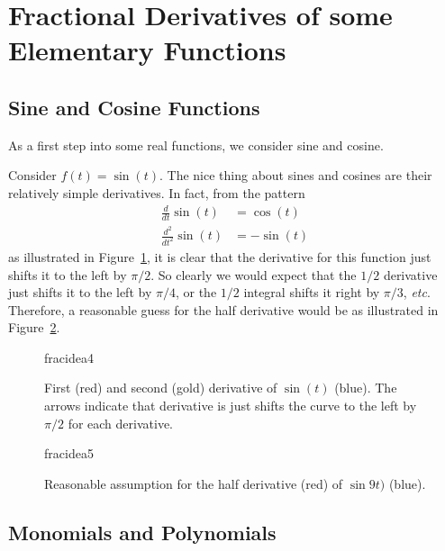 \section{Fractional Derivatives of some Elementary Functions}
\subsection{Sine and Cosine Functions}
As a first step into some real functions, we consider sine and cosine.

\begin{example}
  Consider $f(t) = \sin(t)$. The nice thing about sines and cosines are their relatively simple derivatives. In fact, from the pattern
  \begin{align*}
    \frac{d}{dt} \sin(t) &= \cos(t) \\
    \frac{d^2}{dt^2} \sin(t) &= -\sin(t)
  \end{align*}
  as illustrated in Figure~\ref{fig:fracidea4}, it is clear that the derivative for this function just shifts it to the left by $\pi/2$. So clearly we would expect that the $1/2$ derivative just shifts it to the left by $\pi/4$, or the $1/2$ integral shifts it right by $\pi/3$, \textit{etc}. Therefore, a reasonable guess for the half derivative would be as illustrated in Figure~\ref{fig:fracidea5}.

  \begin{figure}
    \centering
    {fracidea4}
    \caption{First (red) and second (gold) derivative of $\sin(t)$ (blue). The arrows indicate that derivative is just shifts the curve to the left by $\pi/2$ for each derivative.}
    \label{fig:fracidea4}
  \end{figure}

  \begin{figure}
    \centering
    {fracidea5}
  \caption{Reasonable assumption for the half derivative (red) of $\sin9t)$ (blue).}
  \label{fig:fracidea5}
\end{figure}

\end{example}

\subsection{Monomials and Polynomials}

